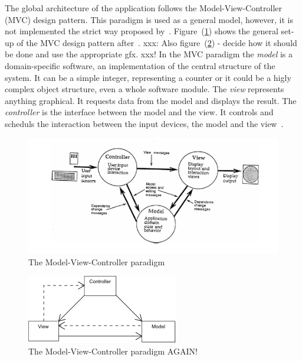 The global architecture of the application follows the Model-View-Controller
(MVC) design pattern. This paradigm is used as a general model, however, 
it is not implemented the strict way proposed by~.
Figure~(\ref{fig:modelviewcontroller}) shows the general set-up of the 
MVC design pattern after~. xxx: Also 
figure~(\ref{fig:modelviewcontroller2}) - decide how it should be done and use
the appropriate gfx. xxx!
In the MVC paradigm the \emph{model} is a domain-specific software, 
an implementation of the central structure of the system. It can be a simple
integer, representing a counter or it could be a higly complex object structure, 
even a whole software module. The \emph{view} represents anything graphical. 
It requests data from the model and displays the result. The \emph{controller} 
is the interface between the model and the view. It controls and scheduls the 
interaction between the input devices, the model and the 
view~.
\begin{figure}[htbp]
\begin{center}
\includegraphics[scale=0.5]{images/TechnicalDesign/MVC.png}
\caption{The Model-View-Controller paradigm}
\label{fig:modelviewcontroller}
\end{center}
\end{figure}

\begin{figure}[htbp]
\begin{center}
\includegraphics[scale=0.5]{images/TechnicalDesign/ModelViewControllerDiagram.png}
\caption{The Model-View-Controller paradigm AGAIN!}
\label{fig:modelviewcontroller2}
\end{center}
\end{figure}

